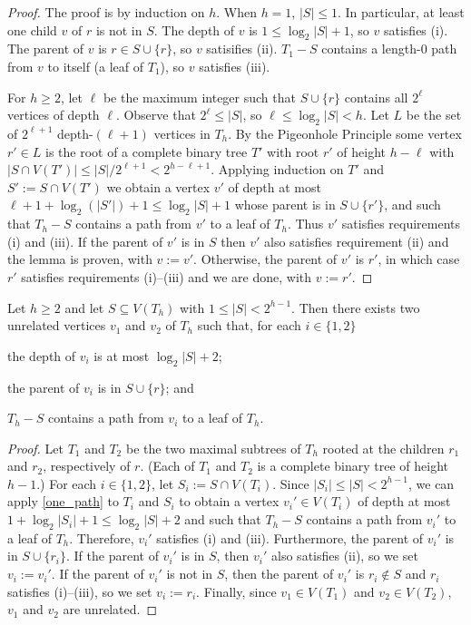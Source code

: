\documentclass{patmorin}
\renewcommand{\le}{\leqslant}
\renewcommand{\ge}{\geqslant}
\begin{document}
\begin{proof}
  The proof is by induction on $h$.  When $h=1$, $|S|\le 1$. In particular, at least one child $v$ of $r$ is not in $S$.  The depth of $v$ is $1\le \log_2|S|+1$, so $v$ satisfies (i).  The parent of $v$ is $r\in S\cup\{r\}$, so $v$ satisifies (ii).  $T_1-S$ contains a length-$0$ path from $v$ to itself (a leaf of $T_1$), so $v$ satisfies (iii).

  For $h\ge 2$, let $\ell$ be the maximum integer such that $S\cup\{r\}$ contains all $2^\ell$ vertices of depth $\ell$.  Observe that $2^\ell \le |S|$, so $\ell \le \log_2 |S| < h$.  Let $L$ be the set of $2^{\ell+1}$ depth-$(\ell+1)$ vertices in $T_h$.  By the Pigeonhole Principle some vertex $r'\in L$ is the root of a complete binary tree $T'$ with root $r'$ of height $h-\ell$ with $|S\cap V(T')| \le |S|/2^{\ell+1} < 2^{h-\ell+1}$.  Applying induction on $T'$ and $S':=S\cap V(T')$ we obtain a vertex $v'$ of depth at most $\ell+1+\log_2(|S'|)+1 \le \log_2|S|+1$ whose parent is in $S\cup\{r'\}$, and such that $T_h-S$ contains a path from $v'$ to a leaf of $T_h$.  Thus $v'$ satisfies requirements (i) and (iii).  If the parent of $v'$ is in $S$ then $v'$ also satisfies requirement (ii) and the lemma is proven, with $v:=v'$.  Otherwise, the parent of $v'$ is $r'$, in which case $r'$ satisfies requirements (i)--(iii) and we are done, with $v:=r'$.
\end{proof}

\begin{lem}\label{two_paths}
  Let $h\ge 2$
  and let $S\subseteq V(T_h)$ with $1\le |S|< 2^{h-1}$. Then there exists two unrelated vertices $v_1$ and $v_2$ of $T_h$ such that, for each $i\in\{1,2\}$
  \begin{compactenum}[(i)]
    \item the depth of $v_i$ is at most $\log_2|S|+2$;
    \item the parent of $v_i$ is in $S\cup\{r\}$; and
    \item $T_h-S$ contains a path from $v_i$ to a leaf of $T_h$.
  \end{compactenum}
\end{lem}

\begin{proof}
  Let $T_1$ and $T_2$ be the two maximal subtrees of $T_h$ rooted at the children $r_1$ and $r_2$, respectively of $r$. (Each of $T_1$ and $T_2$ is a complete binary tree of height $h-1$.)  For each $i\in\{1,2\}$, let $S_i:=S\cap V(T_i)$.  Since $|S_i|\le |S|< 2^{h-1}$, we can apply \cref{one_path} to $T_i$ and $S_i$ to obtain a vertex $v_i'\in V(T_i)$ of depth at most $1+\log_2|S_i|+1 \le \log_2 |S| + 2$ and such that $T_h-S$ contains a path from $v_i'$ to a leaf of $T_h$.  Therefore, $v_i'$ satisfies (i) and (iii).  Furthermore, the parent of $v_i'$ is in $S\cup\{r_i\}$.  If the parent of $v_i'$ is in $S$, then $v_i'$ also satisfies (ii), so we set $v_i:=v_i'$.  If the parent of $v_i'$ is not in $S$, then the parent of $v_i'$ is $r_i\not\in S$ and $r_i$ satisfies (i)--(iii), so we set $v_i:=r_i$.  Finally, since $v_1\in V(T_1)$ and $v_2\in V(T_2)$, $v_1$ and $v_2$ are unrelated.
\end{proof}
\end{document}
